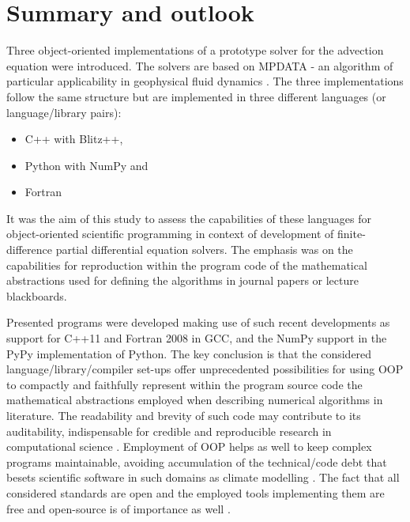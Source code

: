 \documentclass[final,5p,times,twocolumn]{elsarticle}
\begin{document}
  \section{Summary and outlook}

  Three object-oriented implementations of a prototype solver 
    for the advection equation were introduced.
  The solvers are based on MPDATA - an algorithm of particular applicability
    in geophysical fluid dynamics \citep{Smolarkiewicz_2006}.
  The three implementations follow the same structure but are implemented
    in three different languages (or language/library pairs):
  \begin{itemize}
    \item{C++ with Blitz++,}
    \item{Python with NumPy and}
    \item{Fortran}
  \end{itemize}
  It was the aim of this study to assess the capabilities of these languages
    for object-oriented scientific programming in context of 
    development of finite-difference partial differential equation solvers.
  The emphasis was on the capabilities for reproduction within 
    the program code of the mathematical abstractions used for defining the algorithms
    in journal papers or lecture blackboards.

  Presented programs were developed making use of such recent
    developments as support for C++11 and Fortran 2008 in GCC, and
    the NumPy support in the PyPy implementation of Python.
  The key conclusion is that the considered language/library/compiler
    set-ups offer unprecedented possibilities for using OOP to compactly 
    and faithfully represent within the program source code 
    the mathematical abstractions employed when describing 
    numerical algorithms in literature.
  The readability and brevity of such code may contribute to its 
    auditability, indispensable for credible and reproducible research in computational science 
    \citep{Post_et_al_2005, Merali_et_al_2010, Stodden_et_al_2012}.
  Employment of OOP helps as well to keep complex programs maintainable, avoiding accumulation of the technical/code 
    debt \citep{Buschmann_2011} that besets scientific software in such domains as climate modelling
    \citep{Freeman_et_al_2010}.
  The fact that all considered standards are open and the employed 
    tools implementing them are free and open-source
    is of importance as well \citep{Anel_2011}.
    
\end{document}
